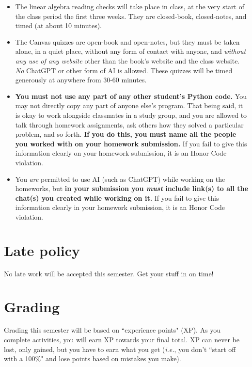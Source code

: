 \documentclass[12pt]{article}
\begin{document}
\begin{itemize}
\itemsep.1em

\item The linear algebra reading checks will take place in class, at the very
start of the class period the first three weeks. They are closed-book,
closed-notes, and timed (at about 10 minutes).

\item The Canvas quizzes are open-book and open-notes, but they must be taken
alone, in a quiet place, without any form of contact with anyone, and
\textit{without any use of any website} other than the book's website and the
class website. \textit{No} ChatGPT or other form of AI is allowed. These
quizzes will be timed generously at anywhere from 30-60 minutes.

\item \textbf{You must not use any part of any other student's Python code.}
You may not directly copy any part of anyone else's program. That being said,
it is okay to work alongside classmates in a study group, and you are allowed
to talk through homework assignments, ask others how they solved a particular
problem, and so forth. \textbf{If you do this, you must name all the people you
worked with on your homework submission.} If you fail to give this information
clearly on your homework submission, it is an Honor Code violation.

\item You \textit{are} permitted to use AI (such as ChatGPT) while working on
the homeworks, but \textbf{in your submission you \textit{must} include link(s)
to all the chat(s) you created while working on it.} If you fail to give this
information clearly in your homework submission, it is an Honor Code
violation.

\end{itemize}


\section*{Late policy}

No late work will be accepted this semester. Get your stuff in on time!

\bigskip

\section*{Grading}

Grading this semester will be based on ``experience points" (XP). As you
complete activities, you will earn XP towards your final total. XP can never
be lost, only gained, but you have to earn what you get (\textit{i.e.}, you
don't ``start off with a 100\%" and lose points based on mistakes you make).
\end{document}
